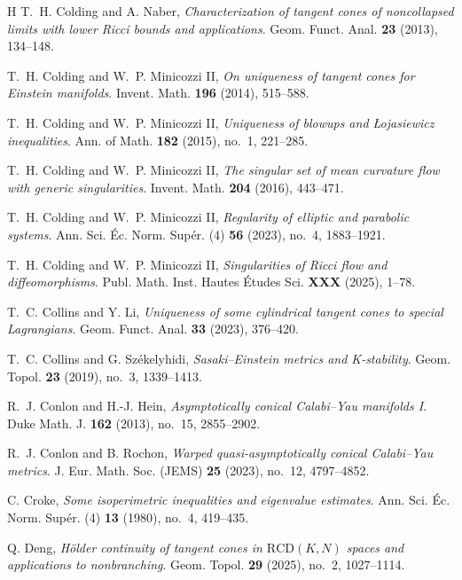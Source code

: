 \documentclass[11pt,reqno]{amsart}
\numberwithin{equation}{section}
\theoremstyle{definition}
\theoremstyle{remark}
\begin{document}
\begin{thebibliography}{H}
T.~H. Colding and A. Naber,
\textit{Characterization of tangent cones of noncollapsed limits with lower Ricci bounds and applications}.
Geom. Funct. Anal. \textbf{23} (2013), 134--148.

T.~H. Colding and W.~P. Minicozzi II,
\textit{On uniqueness of tangent cones for Einstein manifolds}.
Invent. Math. \textbf{196} (2014), 515--588.

T.~H. Colding and W.~P. Minicozzi II,
\textit{Uniqueness of blowups and Łojasiewicz inequalities}.
Ann. of Math. \textbf{182} (2015), no.~1, 221--285.

T.~H. Colding and W.~P. Minicozzi II,
\textit{The singular set of mean curvature flow with generic singularities}.
Invent. Math. \textbf{204} (2016), 443--471.

T.~H. Colding and W.~P. Minicozzi II,
\textit{Regularity of elliptic and parabolic systems}.
Ann. Sci. Éc. Norm. Supér. (4) \textbf{56} (2023), no.~4, 1883--1921.

T.~H. Colding and W.~P. Minicozzi II,
\textit{Singularities of Ricci flow and diffeomorphisms}.
Publ. Math. Inst. Hautes Études Sci. \textbf{XXX} (2025), 1--78.

T.~C. Collins and Y. Li, 
{\textit{Uniqueness of some cylindrical tangent cones to special Lagrangians}}. Geom. Funct. Anal. \textbf{33} (2023), 376--420. 


T.~C. Collins and G. Székelyhidi,
{\textit{Sasaki--Einstein metrics and K-stability}}.
Geom. Topol. \textbf{23} (2019), no.~3, 1339--1413.

R.~J. Conlon and H.-J. Hein,
{\textit{Asymptotically conical Calabi--Yau manifolds I}}.
Duke Math. J. \textbf{162} (2013), no.~15, 2855--2902.

R.~J. Conlon and B. Rochon,
\textit{Warped quasi-asymptotically conical Calabi--Yau metrics}.
J. Eur. Math. Soc. (JEMS) \textbf{25} (2023), no.~12, 4797--4852.

C. Croke,
{\textit{Some isoperimetric inequalities and eigenvalue estimates}}.
Ann. Sci. Éc. Norm. Supér. (4) \textbf{13} (1980), no.~4, 419--435.

Q. Deng,
\textit{Hölder continuity of tangent cones in $\mathrm{RCD}(K,N)$ spaces and applications to nonbranching}.
Geom. Topol. \textbf{29} (2025), no.~2, 1027--1114.


\end{thebibliography}
\end{document}
